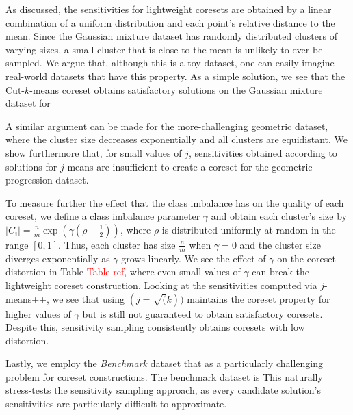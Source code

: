 As discussed, the sensitivities for lightweight coresets are obtained by a linear combination of a uniform distribution and each point's relative
distance to the mean. Since the Gaussian mixture dataset has randomly distributed clusters of varying sizes, a small cluster that is close to the mean is unlikely
to ever be sampled. We argue that, although this is a toy dataset, one can easily imagine real-world datasets that have this property. 
As a simple solution, we see
that the Cut-$k$-means coreset obtains satisfactory solutions on the Gaussian mixture dataset for 

A similar argument can be made for the more-challenging geometric dataset, where the cluster size decreases exponentially and all clusters are equidistant.
We show furthermore that, for small values of $j$, sensitivities obtained according to
solutions for $j$-means are insufficient to create a coreset for the geometric-progression dataset.

To measure further the effect that the class imbalance has on the quality of each coreset, we define a class imbalance parameter $\gamma$ and obtain each
cluster's size by $|C_i| = \frac{n}{m} \exp \left( \gamma(\rho - \frac{1}{2}) \right)$, where $\rho$ is distributed uniformly at random in the range $[0, 1]$.
Thus, each cluster has size $\frac{n}{m}$ when $\gamma = 0$ and the cluster size diverges exponentially as $\gamma$ grows linearly. We see the effect of $\gamma$ on the coreset
distortion in Table \textcolor{red}{Table ref}, where even small values of $\gamma$ can break the lightweight coreset construction. Looking at the
sensitivities computed via $j$-means++, we see that using $(j=\sqrt(k))$ maintains the coreset property for higher values of $\gamma$ but is still not guaranteed
to obtain satisfactory coresets. Despite this, sensitivity sampling consistently obtains coresets with low distortion. 

Lastly, we employ the \emph{Benchmark} dataset that  as a particularly challenging problem for coreset constructions.  The
benchmark dataset is  This naturally stress-tests
the sensitivity sampling approach, as every candidate solution's sensitivities are particularly difficult to approximate. 



